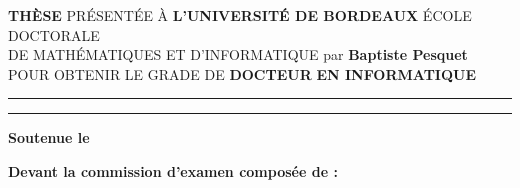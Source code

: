 \begin{titlepage}
\begin{center}
        \huge  {\bf THÈSE}
        \vfill
        \large PRÉSENTÉE À
        \vfill
        \Large  {\bf L'UNIVERSITÉ DE BORDEAUX}
        \vfill
        \Large ÉCOLE DOCTORALE\\DE MATHÉMATIQUES ET D'INFORMATIQUE
        \vfill
        \Large par {\bf Baptiste Pesquet}
        \vfill
        \large POUR OBTENIR LE GRADE DE
        \vfill
        \Large {\bf DOCTEUR}
        \vfill
        \Large {\bf EN INFORMATIQUE}
        \vfill
        \rule{4em}{1pt}
        \vfill
        \Large {\bf \thesisTitleFrench}
        \vfill
        \rule{4em}{1pt}
    \end{center}

    \vfill


    {\bf Soutenue le } \thesisDate

    \vfill

    {\bf Devant la commission d'examen composée de :}

    \vfill

\end{titlepage}

\restoregeometry
